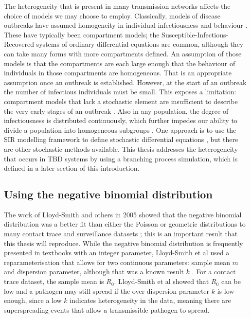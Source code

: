 \documentclass{article}
\begin{document}
The heterogeneity that is present in many transmission networks affects the choice of models we may choose to employ. Classically, models of disease outbreaks have assumed homogeneity in individual infectiousness and behaviour \cite{Garske2008}. These have typically been compartment models; the Susceptible-Infectious-Recovered systems of ordinary differential equations are common, although they can take many forms with more compartments defined. An assumption of those models is that the compartments are each large enough that the behaviour of individuals in those compartments are homogeneous. That is an appropriate assumption once an outbreak is established. However, at the start of an outbreak the number of infectious individuals must be small. This exposes a limitation: compartment models that lack a stochastic element are insufficient to describe the very early stages of an outbreak \cite{Brauer2008a}. Also in any population, the degree of infectiousness is distributed continuously, which further impedes our ability to divide a population into homogeneous subgroups \cite{LloydSmith2005}. One approach is to use the SIR modelling framework to define stochastic differential equations \cite{Allen2017}, but there are other stochastic methods available. This thesis addresses the heterogeneity that occurs in TBD systems by using a branching process simulation, which is defined in a later section of this introduction.

\subsection{Using the negative binomial distribution}

The work of Lloyd-Smith and others in 2005 showed that the negative binomial distribution was a better fit than either the Poisson or geometric distributions to many contact trace and surveillance datasets \cite{LloydSmith2005}; this is an important result that this thesis will reproduce. While the negative binomial distribution is frequently presented in textbooks with an integer parameter, Lloyd-Smith et al used a reparameterisation that allows for two continuous parameters: sample mean $ m $ and dispersion parameter, although that was a known result $ k $ \cite{Rice2007}. For a contact trace dataset, the sample mean is $ R_0 $. Lloyd-Smith et al showed that $ R_0 $ can be low and a pathogen may still spread if the over-dispersion parameter $ k $ is low enough, since a low $ k $ indicates heterogeneity in the data, meaning there are superspreading events that allow a transmissible pathogen to spread.
\end{document}

